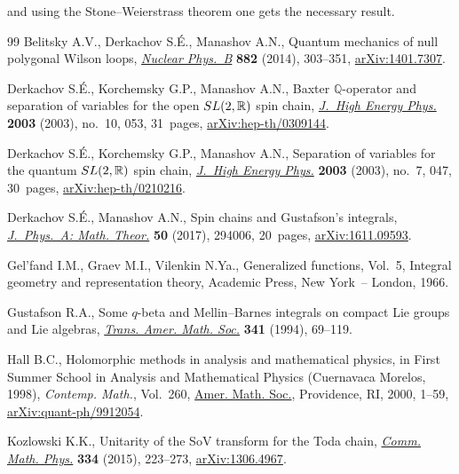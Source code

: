 \documentclass[11pt]{article}
\numberwithin{equation}{section}
\numberwithin{equation}{section}
\begin{document}
and using the Stone--Weierstrass theorem one gets the necessary result.
\begin{thebibliography}{99}
Belitsky A.V., Derkachov S.\'E., Manashov A.N., Quantum mechanics of null
 polygonal {W}ilson loops, \href{https://doi.org/10.1016/j.nuclphysb.2014.03.007}{\textit{Nuclear Phys.~B}} \textbf{882} (2014),
 303--351, \href{https://arxiv.org/abs/1401.7307}{arXiv:1401.7307}.

Derkachov S.\'E., Korchemsky G.P., Manashov A.N., Baxter {$\mathbb Q$}-operator
 and separation of variables for the open {${\rm SL}(2,{\mathbb R})$} spin
 chain, \href{https://doi.org/10.1088/1126-6708/2003/10/053}{\textit{J.~High Energy Phys.}} \textbf{2003} (2003), no.~10, 053,
 31~pages, \href{https://arxiv.org/abs/hep-th/0309144}{arXiv:hep-th/0309144}.

Derkachov S.\'E., Korchemsky G.P., Manashov A.N., Separation of variables for the
 quantum {${\rm SL}(2,\mathbb R)$} spin chain, \href{https://doi.org/10.1088/1126-6708/2003/07/047}{\textit{J.~High Energy Phys.}}
 \textbf{2003} (2003), no.~7, 047, 30~pages, \href{https://arxiv.org/abs/hep-th/0210216}{arXiv:hep-th/0210216}.

Derkachov S.\'E., Manashov A.N., Spin chains and {G}ustafson's integrals,
 \href{https://doi.org/10.1088/1751-8121/aa749a}{\textit{J.~Phys.~A: Math. Theor.}} \textbf{50} (2017), 294006, 20~pages,
 \href{https://arxiv.org/abs/1611.09593}{arXiv:1611.09593}.

Gel'fand I.M., Graev M.I., Vilenkin N.Ya., Generalized functions, {V}ol.~5,
 Integral geometry and representation theory, Academic Press, New York~--
 London, 1966.

Gustafson R.A., Some {$q$}-beta and {M}ellin--{B}arnes integrals on compact
 {L}ie groups and {L}ie algebras, \href{https://doi.org/10.2307/2154615}{\textit{Trans. Amer. Math. Soc.}}
 \textbf{341} (1994), 69--119.

Hall B.C., Holomorphic methods in analysis and mathematical physics, in First
 {S}ummer {S}chool in {A}nalysis and {M}athematical {P}hysics ({C}uernavaca
 {M}orelos, 1998), \textit{Contemp. Math.}, Vol.~260, \href{https://doi.org/10.1090/conm/260/04156}{Amer. Math. Soc.},
 Providence, RI, 2000, 1--59, \href{https://arxiv.org/abs/quant-ph/9912054}{arXiv:quant-ph/9912054}.

Kozlowski K.K., Unitarity of the {S}o{V} transform for the {T}oda chain,
 \href{https://doi.org/10.1007/s00220-014-2134-6}{\textit{Comm. Math. Phys.}} \textbf{334} (2015), 223--273, \href{https://arxiv.org/abs/1306.4967}{arXiv:1306.4967}.


\end{thebibliography}
\end{document}
